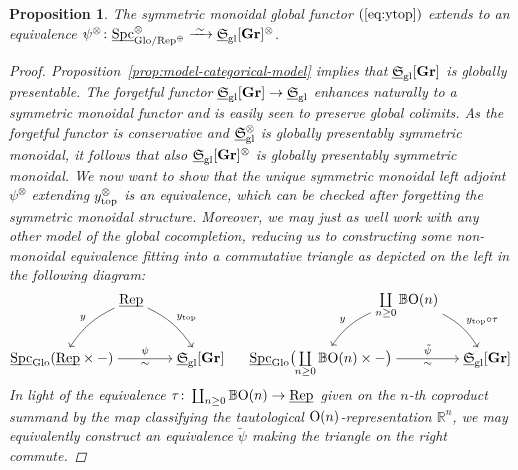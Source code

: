 \documentclass[reqno]{memo-l}
\theoremstyle{mythm}
\newtheorem{prop}[thm]{Proposition}
\theoremstyle{definition}
\numberwithin{equation}{section}
\newcommand{\R} {{\mathbb{R}}}
\newcommand{\gl}{\textup{gl}}
\DeclareMathOperator{\Spc}{Spc}
\renewcommand{\top}{{\textup{top}}}
\newcommand{\cat}[1]{\textbf{\textup{#1}}}
\renewcommand{\O}{{\textup{O}}}
\newcommand{\Glo}{\textup{Glo}}
\newcommand{\BGcat}[1]{\mathbb B{#1}}
\newcommand{\ulhelper}[2]{\underline{\setbox0=\hbox{$#1#2$}\dp0=0.4pt \box0\relax}}
\newcommand{\ul}[1]{{\mathpalette\ulhelper{#1}}\hbox{\rule[-2pt]{0pt}{0pt}}}
\newcommand{\iso}{\xrightarrow{\;\smash{\raisebox{-0.25ex}{\ensuremath{\scriptstyle\sim}}}\;}}
\newcommand{\myS}{{{\mathfrak S\kern-.4pt}}}
\newcommand{\Vect}{\textup{Rep}}
\newcommand{\Gr}{\cat{Gr}}
\begin{document}
\begin{prop}\label{prop:construction-of-psi-otimes}
    The symmetric monoidal global functor $(\ref{eq:ytop})$ extends to an equivalence $\psi^\otimes\colon\ul\Spc_{\Glo/\Vect^\oplus}^\otimes\iso\ul\myS_\gl[\cat{Gr}]^\otimes$.
    \begin{proof}Proposition~\ref{prop:model-categorical-model} implies that $\ul\myS_{\gl}[\Gr]$ is globally presentable. 
    The forgetful functor $\ul\myS_{\gl}[\Gr]\to \ul\myS_{\gl}$ enhances naturally to a symmetric monoidal functor and is easily seen to preserve global colimits. As the forgetful functor is conservative and $\ul\myS_{\gl}^\otimes$ is globally presentably symmetric monoidal, it follows that also $\ul\myS_{\gl}[\Gr]^{\otimes}$ is globally presentably symmetric monoidal. 
    We now want to show that the unique symmetric monoidal left adjoint $\psi^\otimes$ extending $y_\top^\otimes$ is an equivalence, which can be checked after forgetting the symmetric monoidal structure. Moreover, we may just as well work with any other model of the global cocompletion, reducing us to constructing some \emph{non-monoidal} equivalence fitting into a commutative triangle as depicted on the left in the following diagram:
        \[
            \begin{tikzcd}[column sep=small,cramped]
                &[-1.4em] \ul\Vect\arrow[dl, bend right=15pt,"y"']\arrow[dr,bend left=15pt,"y_\top"] &[.6em]&[0em]&[-3em] \coprod\limits_{\smash{n\ge0}}\BGcat{\O(n)}\arrow[dl,bend right=15pt,"y"']\arrow[dr,bend left=15pt,"y_\top\circ\tau"]\\
                \ul\Spc_{\Glo}(\ul\Vect\times{-})\arrow[rr,"\psi","\sim"'] && \ul\myS_\gl[\cat{Gr}] &
                \ul\Spc_{\Glo}\big(\kern-1pt{\coprod\limits_{\smash{n\ge0}}\BGcat{\O(n)}\times{-}}\big) \arrow[rr,"\tilde\psi","\sim"'] && \ul\myS_\gl[\cat{Gr}]
            \end{tikzcd}
        \]
        In light of the equivalence $\tau\colon\coprod_{n\ge0}\BGcat{\O(n)}\to\ul\Vect$ given on the $n$-th coproduct summand by the map classifying the tautological $\O(n)$-representation $\R^n$, we may equivalently construct an equivalence $\tilde\psi$ making the triangle on the right commute. 
        

\end{proof}
\end{prop}
\end{document}
